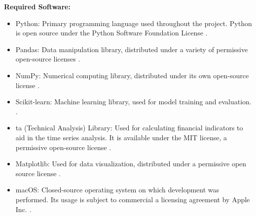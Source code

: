 \documentclass[12pt]{report} %
\begin{document}
\noindent \textbf{Required Software:}
\begin{itemize}
    \item Python: Primary programming language used throughout the project. Python is open source under the Python Software Foundation License \cite{python}.
    
    \item Pandas: Data manipulation library, distributed under a variety of permissive open-source licenses \cite{pandas}.
    
    \item NumPy: Numerical computing library, distributed under its own open-source license \cite{numpy}. 
    
    \item Scikit-learn: Machine learning library, used for model training and evaluation. \cite{scikit-learn}.
    
    \item ta (Technical Analysis) Library: Used for calculating financial indicators to aid in the time series analysis. It is available under the MIT license, a permissive open-source license \cite{ta-lib}.
    
    \item Matplotlib: Used for data visualization, distributed under a permissive open source license \cite{matplotlib}.
    
    \item macOS: Closed-source operating system on which development was performed. Its usage is subject to commercial a licensing agreement by Apple Inc. \cite{macos}.
\end{itemize}
\end{document}
